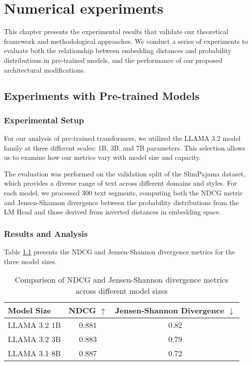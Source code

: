 \chapter{Numerical experiments}

This chapter presents the experimental results that validate our theoretical framework and methodological approaches. We conduct a series of experiments to evaluate both the relationship between embedding distances and probability distributions in pre-trained models, and the performance of our proposed architectural modifications.

\section{Experiments with Pre-trained Models}

\subsection{Experimental Setup}

For our analysis of pre-trained transformers, we utilized the LLAMA 3.2 model family at three different scales: 1B, 3B, and 7B parameters. This selection allows us to examine how our metrics vary with model size and capacity.

The evaluation was performed on the validation split of the SlimPajama dataset, which provides a diverse range of text across different domains and styles. For each model, we processed 300 text segments, computing both the NDCG metric and Jensen-Shannon divergence between the probability distributions from the LM Head and those derived from inverted distances in embedding space.

\subsection{Results and Analysis}

Table \ref{tab:pretrained_metrics} presents the NDCG and Jensen-Shannon divergence metrics for the three model sizes.

\begin{table}[h]
    \centering
    \caption{Comparison of NDCG and Jensen-Shannon divergence metrics across different model sizes}
    \begin{tabular}{lcc}
    \toprule
    Model Size & NDCG $\uparrow$ & Jensen-Shannon Divergence $\downarrow$ \\
    \midrule
    LLAMA 3.2 1B & 0.881 & 0.82 \\
    LLAMA 3.2 3B & 0.883 & 0.79 \\
    LLAMA 3.1 8B & 0.887 & 0.72 \\
    \bottomrule
    \end{tabular}
    \label{tab:pretrained_metrics}
\end{table}

